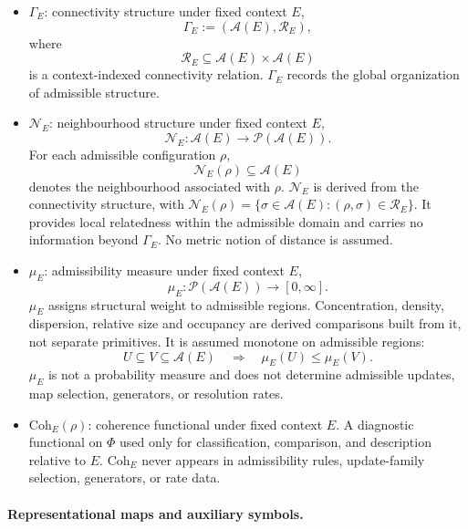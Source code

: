 \documentclass[aps,prx,onecolumn,11pt]{revtex4-2}
\theoremstyle{plain}
\theoremstyle{definition}
\theoremstyle{remark}
\begin{document}
\begin{itemize}
\item $\Gamma_E$: connectivity structure under fixed context $E$,
\[
\Gamma_E := (\mathcal{A}(E),\mathcal{R}_E),
\]
where
\[
\mathcal{R}_E
\subseteq
\mathcal{A}(E)\times\mathcal{A}(E)
\]
is a context-indexed connectivity relation.
$\Gamma_E$ records the global organization of admissible structure.
\item $\mathcal{N}_E$: neighbourhood structure under fixed context $E$,
\[
\mathcal{N}_E:
\mathcal{A}(E)
\rightarrow
\mathcal{P}(\mathcal{A}(E)).
\]
For each admissible configuration $\rho$,
\[
\mathcal{N}_E(\rho)
\subseteq
\mathcal{A}(E)
\]
denotes the neighbourhood associated with $\rho$.
$\mathcal{N}_E$ is derived from the connectivity structure, with
$\mathcal{N}_E(\rho)=\{\sigma\in\mathcal{A}(E):(\rho,\sigma)\in\mathcal{R}_E\}$.
It provides local relatedness within the admissible domain and carries
no information beyond $\Gamma_E$. No metric notion of distance is
assumed.

\item $\mu_E$: admissibility measure under fixed context $E$,
\[
\mu_E:
\mathcal{P}(\mathcal{A}(E))
\rightarrow
[0,\infty].
\]
$\mu_E$ assigns structural weight to admissible regions.
Concentration, density, dispersion, relative size and occupancy are
derived comparisons built from it, not separate primitives.
It is assumed monotone on admissible regions:
\[
U\subseteq V\subseteq \mathcal{A}(E)
\quad\Longrightarrow\quad
\mu_E(U)\leq \mu_E(V).
\]
$\mu_E$ is not a probability measure and does not determine admissible
updates, map selection, generators, or resolution rates.

\item $\mathrm{Coh}_E(\rho)$: coherence functional under fixed context
$E$.
A diagnostic functional on $\Phi$ used only for classification,
comparison, and description relative to $E$.
$\mathrm{Coh}_E$ never appears in admissibility rules, update-family
selection, generators, or rate data.

\end{itemize}

\paragraph{Representational maps and auxiliary symbols.}
\end{document}
